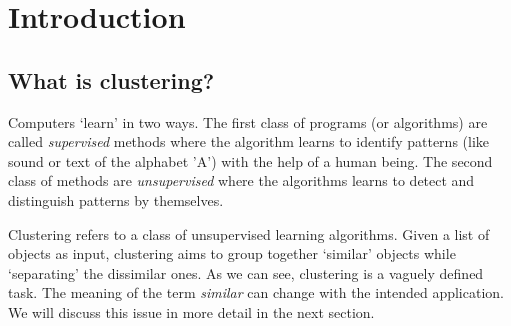 \documentclass[letterpaper,12pt,titlepage,oneside,final]{book}
\begin{document}
 








\chapter{Introduction}
\section{What is clustering?}
Computers `learn' in two ways. The first class of programs (or algorithms) are called \textit{supervised} methods where the algorithm learns to identify patterns (like sound or text of the alphabet 'A') with the help of a human being.  The second class of methods are \textit{unsupervised} where the algorithms learns to detect and distinguish patterns by themselves. 

Clustering refers to a class of unsupervised learning algorithms. Given a list of objects as input, clustering aims to group together `similar' objects while `separating' the dissimilar ones. As we can see, clustering is a vaguely defined task. The meaning of the term \textit{similar} can change with the intended application. We will discuss this issue in more detail in the next section. 
\end{document}
